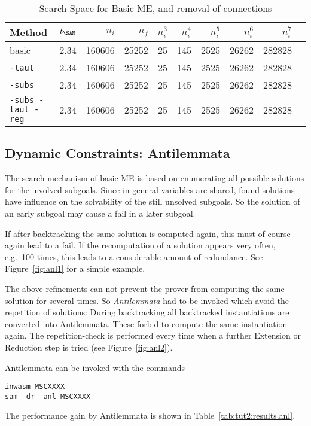 \begin{table}[htb]
\begin{center}
\begin{tabular}{|l|r|r||r|r||r|r|r|r|r|}
\hline
Method & $t_{\SAM}$ & $n_i$ & $n_f$ & 
	$n_i^3$ & $n_i^4$ & $n_i^5$ & $n_i^6$ & $n_i^7$ \\
\hline\hline
basic & 2.34 & 160606 & 25252 &
	25 & 145 & 2525 & 26262 & 282828 \\
\hline
{\tt -taut} & 2.34 & 160606 & 25252 &
	25 & 145 & 2525 & 26262 & 282828 \\
\hline
{\tt -subs} & 2.34 & 160606 & 25252 &
	25 & 145 & 2525 & 26262 & 282828 \\
\hline
{\tt -subs -taut -reg} & 2.34 & 160606 & 25252 &
	25 & 145 & 2525 & 26262 & 282828 \\
\hline\hline
\end{tabular}
\end{center}
\caption{Search Space for Basic ME, and removal of connections}
\label{tab:tut2:results.linksubs}
\end{table}


\subsection{Dynamic Constraints: Antilemmata}

The search mechanism of basic ME is based on enumerating all
possible solutions for the involved subgoals. Since in general
variables are shared, found solutions have influence on the solvability
of the still unsolved subgoals. So the solution of an early subgoal
may cause a fail in a later subgoal. 

If after backtracking the same solution is computed again, this must
of course again lead to a fail. If the recomputation of a solution
appears very often, e.g.\ 100 times, this leads to a considerable
amount of redundance. See Figure~\ref{fig:anl1} for a simple example. 


The above refinements can not prevent the prover from computing the
same solution for several times. So {\em Antilemmata\/} had to be
invoked which avoid the repetition of solutions: 
During backtracking all backtracked instantiations are converted into
Antilemmata. These forbid to compute the same instantiation again.
The repetition-check is performed every time when a further
Extension or Reduction step is tried (see Figure~\ref{fig:anl2}). 


Antilemmata can be invoked with the commands
\begin{center}
\begin{verbatim}
inwasm MSCXXXX
sam -dr -anl MSCXXXX
\end{verbatim}
\end{center}
The performance gain by Antilemmata is shown in
Table~\ref{tab:tut2:results.anl}. 

